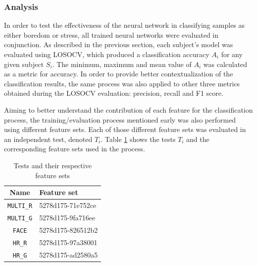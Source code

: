 \subsubsection{Analysis}
\label{s:experiment1-study5-analysis}

In order to test the effectiveness of the neural network in classifying samples as either boredom or stress, all trained neural networks were evaluated in conjunction. As described in the previous section, each subject's model was evaluated using LOSOCV, which produced a classification accuracy $A_i$ for any given subject $S_i$. The minimum, maximum and mean value of $A_i$ was calculated as a metric for accuracy. In order to provide better contextualization of the classification results, the same process was also applied to other three metrics obtained during the LOSOCV evaluation: precision, recall and F1 score.

Aiming to better understand the contribution of each feature for the classification process, the training/evaluation process mentioned early was also performed using different feature sets. Each of those different feature sets was evaluated in an independent test, denoted $T_i$. Table \ref{table:study5-different-feature-sets} shows the tests $T_i$ and the corresponding feature sets used in the process.

\begin{table}
    \centering
    \caption{Tests and their respective feature sets}
    \label{table:study5-different-feature-sets}
    \begin{tabular}[l]{@{}cp{9cm}}
        \hline
            \textbf{Name} & \textbf{Feature set} \\
        \hline
            \texttt{MULTI\_R} & 5278d175-71e752ce \\ %
            \texttt{MULTI\_G} &  5278d175-9fa716ee  \\ %
            \texttt{FACE} &  5278d175-826512b2  \\ %
            \texttt{HR\_R} &  5278d175-97a38001  \\ %
            \texttt{HR\_G} &  5278d175-ad2580a5 \\ %
        \hline
    \end{tabular}
\end{table}

